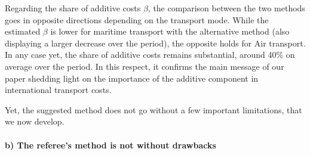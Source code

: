 \documentclass[a4paper,11pt]{article}
\begin{document}
Regarding the share of additive costs $\beta$, the comparison between the two methods goes in opposite directions depending on the transport mode. While the estimated $\beta$ is lower for maritime transport with the alternative method (also displaying a larger decrease over the period), the opposite holds for Air transport. In any case yet, the share of additive costs remains substantial, around 40\% on average over the period. In this respect, it confirms the main message of our paper shedding light on the importance of the additive component in international transport costs.

Yet, the suggested method does not go without a few important limitations, that we now develop.


\paragraph{b) The referee's method is not without drawbacks}
\end{document}
